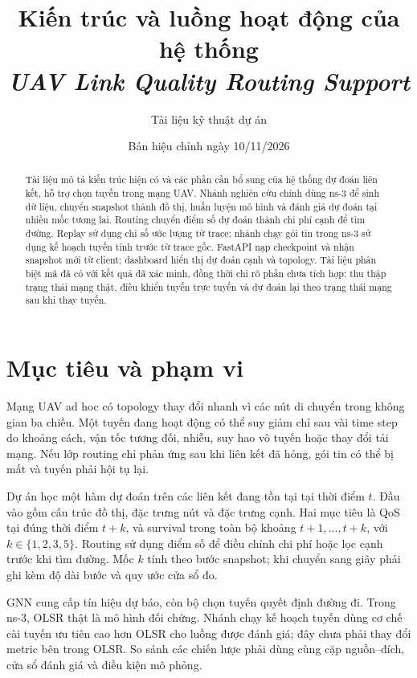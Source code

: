 \documentclass[12pt,a4paper]{article}
\title{Kiến trúc và luồng hoạt động của hệ thống\\
\textit{UAV Link Quality Routing Support}}
\author{Tài liệu kỹ thuật dự án}
\date{Bản hiệu chỉnh ngày 10/11/2026}
\begin{document}
\maketitle

\begin{abstract}
Tài liệu mô tả kiến trúc hiện có và các phần cần bổ sung của hệ thống dự đoán liên kết, hỗ trợ chọn tuyến trong mạng UAV. Nhánh nghiên cứu chính dùng ns-3 để sinh dữ liệu, chuyển snapshot thành đồ thị, huấn luyện mô hình và đánh giá dự đoán tại nhiều mốc tương lai. Routing chuyển điểm số dự đoán thành chi phí cạnh để tìm đường. Replay sử dụng chỉ số ước lượng từ trace; nhánh chạy gói tin trong ns-3 sử dụng kế hoạch tuyến tính trước từ trace gốc. FastAPI nạp checkpoint và nhận snapshot mới từ client; dashboard hiển thị dự đoán cạnh và topology. Tài liệu phân biệt mã đã có với kết quả đã xác minh, đồng thời chỉ rõ phần chưa tích hợp: thu thập trạng thái mạng thật, điều khiển tuyến trực tuyến và dự đoán lại theo trạng thái mạng sau khi thay tuyến.
\end{abstract}

\tableofcontents
\newpage

\section{Mục tiêu và phạm vi}
\label{sec:scope}

Mạng UAV ad hoc có topology thay đổi nhanh vì các nút di chuyển trong không gian ba chiều. Một tuyến đang hoạt động có thể suy giảm chỉ sau vài time step do khoảng cách, vận tốc tương đối, nhiễu, suy hao vô tuyến hoặc thay đổi tải mạng. Nếu lớp routing chỉ phản ứng sau khi liên kết đã hỏng, gói tin có thể bị mất và tuyến phải hội tụ lại.

Dự án học một hàm dự đoán trên các liên kết đang tồn tại tại thời điểm \(t\). Đầu vào gồm cấu trúc đồ thị, đặc trưng nút và đặc trưng cạnh. Hai mục tiêu là QoS tại đúng thời điểm \(t+k\), và survival trong toàn bộ khoảng \(t+1,\ldots,t+k\), với \(k\in\{1,2,3,5\}\). Routing sử dụng điểm số để điều chỉnh chi phí hoặc lọc cạnh trước khi tìm đường. Mốc \(k\) tính theo bước snapshot; khi chuyển sang giây phải ghi kèm độ dài bước và quy ước cửa sổ đo.

GNN cung cấp tín hiệu dự báo, còn bộ chọn tuyến quyết định đường đi. Trong ns-3, OLSR thật là mô hình đối chứng. Nhánh chạy kế hoạch tuyến dùng cơ chế cài tuyến ưu tiên cao hơn OLSR cho luồng được đánh giá; đây chưa phải thay đổi metric bên trong OLSR. So sánh các chiến lược phải dùng cùng cặp nguồn--đích, cửa sổ đánh giá và điều kiện mô phỏng.
\end{document}
